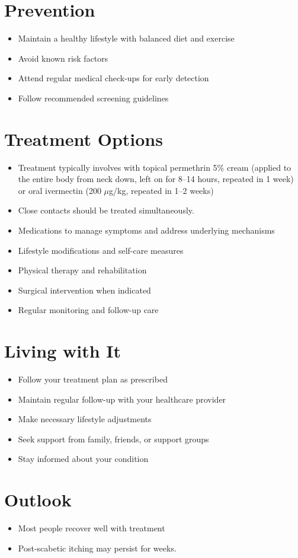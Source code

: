 \section{Prevention}
\begin{itemize}[noitemsep]
  \item Maintain a healthy lifestyle with balanced diet and exercise
  \item Avoid known risk factors
  \item Attend regular medical check-ups for early detection
  \item Follow recommended screening guidelines
\end{itemize}
\section{Treatment Options}
\begin{itemize}[noitemsep]
  \item Treatment typically involves with topical permethrin 5\% cream (applied to the entire body from neck down, left on for 8--14 hours, repeated in 1 week) or oral ivermectin (200 $\mu$g/kg, repeated in 1--2 weeks)
  \item Close contacts should be treated simultaneously.
  \item Medications to manage symptoms and address underlying mechanisms
  \item Lifestyle modifications and self-care measures
  \item Physical therapy and rehabilitation
  \item Surgical intervention when indicated
  \item Regular monitoring and follow-up care
\end{itemize}
\section{Living with It}
\begin{itemize}[noitemsep]
  \item Follow your treatment plan as prescribed
  \item Maintain regular follow-up with your healthcare provider
  \item Make necessary lifestyle adjustments
  \item Seek support from family, friends, or support groups
  \item Stay informed about your condition
\end{itemize}
\section{Outlook}
\begin{itemize}[noitemsep]
  \item Most people recover well with treatment
  \item Post-scabetic itching may persist for weeks.
\end{itemize}
